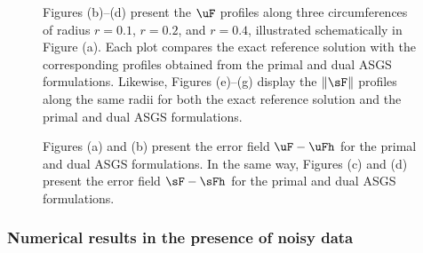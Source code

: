 \begin{figure}[ht!!]
	\centering
	\caption{Figures (b)--(d) present the $\uF$ profiles along three circumferences of radius $r = 0.1$, $r = 0.2$, and $r = 0.4$, illustrated schematically in Figure (a). Each plot compares the exact reference solution with the corresponding profiles obtained from the primal and dual ASGS formulations. Likewise, Figures (e)--(g) display the $\|\sF\|$ profiles along the same radii for both the exact reference solution and the primal and dual ASGS formulations.}
	\fontsize{8pt}{10pt}\selectfont 
	\def\svgwidth{1.0\columnwidth}
	
	\label{fig:plot_over_curve_u_s_primal_dual_ASGS}
\end{figure}

\begin{figure}[ht!!]
	\centering
	\caption{Figures (a) and (b) present the error field $\uF - \uFh$ for the primal and dual ASGS formulations. In the same way, Figures (c) and (d) present the error field $\sF - \sFh$ for the primal and dual ASGS formulations.}
	\fontsize{12pt}{10pt}\selectfont 
	\def\svgwidth{1.0\columnwidth}
	
	\label{fig:inclusion_udif_sdif_primal_dual_ASGS}
\end{figure}

\subsubsection*{Numerical results in the presence of noisy data}

